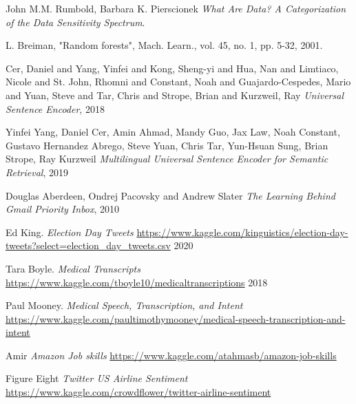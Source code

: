 \begin{thebibliography}{9}
John M.M. Rumbold, Barbara K. Pierscionek\newline
\textit{What Are Data? A Categorization of the Data Sensitivity Spectrum}.

L. Breiman, "Random forests",\newline
Mach. Learn., vol. 45, no. 1, pp. 5-32, 2001.

Cer, Daniel  and Yang, Yinfei  and Kong, Sheng-yi  and
Hua, Nan  and Limtiaco, Nicole  and St. John, Rhomni  and
Constant, Noah  and Guajardo-Cespedes, Mario  and Yuan, Steve  and
Tar, Chris  and Strope, Brian  and Kurzweil, Ray\newline
\textit{Universal Sentence Encoder}, 2018

Yinfei Yang, Daniel Cer, Amin Ahmad, Mandy Guo, Jax Law, Noah Constant, Gustavo Hernandez Abrego, Steve Yuan, Chris Tar, Yun-Hsuan Sung, Brian Strope, Ray Kurzweil
\textit{Multilingual Universal Sentence Encoder for Semantic Retrieval}, 2019

Douglas Aberdeen, Ondrej Pacovsky  and Andrew Slater\newline
\textit{The Learning Behind Gmail Priority Inbox}, 2010

Ed King.
\textit{Election Day Tweets}\newline
\url{https://www.kaggle.com/kinguistics/election-day-tweets?select=election_day_tweets.csv}
2020

Tara Boyle.
\textit{Medical Transcripts}\newline  
\url{https://www.kaggle.com/tboyle10/medicaltranscriptions}
2018

Paul Mooney.
\textit{Medical Speech, Transcription, and Intent}\newline
\url{https://www.kaggle.com/paultimothymooney/medical-speech-transcription-and-intent}

Amir
\textit{Amazon Job skills}\newline
\url{https://www.kaggle.com/atahmasb/amazon-job-skills}

Figure Eight
\textit{Twitter US Airline Sentiment}\newline
\url{https://www.kaggle.com/crowdflower/twitter-airline-sentiment}


\end{thebibliography}
